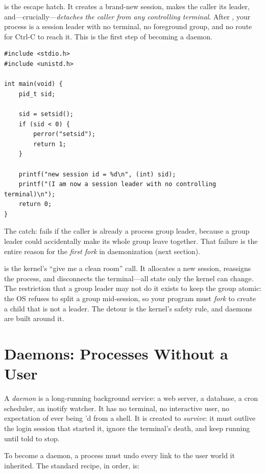  is the escape hatch. It creates a brand-new session,
makes the caller its leader, and---crucially---\emph{detaches the
caller from any controlling terminal}. After , your
process is a session leader with no terminal, no foreground group, and
no route for Ctrl-C to reach it. This is the first step of becoming a
daemon.

\begin{lstlisting}[caption={setsid: new session, no terminal.}]
#include <stdio.h>
#include <unistd.h>

int main(void) {
    pid_t sid;

    sid = setsid();
    if (sid < 0) {
        perror("setsid");
        return 1;
    }

    printf("new session id = %d\n", (int) sid);
    printf("(I am now a session leader with no controlling terminal)\n");
    return 0;
}
\end{lstlisting}

The catch:  fails if the caller is already a process
group leader, because a group leader could accidentally make its whole
group leave together. That failure is the entire reason for the
\emph{first fork} in daemonization (next section).

\begin{osconcept}
 is the kernel's ``give me a clean room'' call. It
allocates a new session, reassigns the process, and disconnects the
terminal---all state only the kernel can change. The restriction that
a group leader may not do it exists to keep the group atomic: the OS
refuses to split a group mid-session, so your program must
\emph{fork} to create a child that is not a leader. The detour is the
kernel's safety rule, and daemons are built around it.
\end{osconcept}

\section{Daemons: Processes Without a User}

A \emph{daemon} is a long-running background service: a web server, a
database, a cron scheduler, an inotify watcher. It has no terminal, no
interactive user, no expectation of ever being 'd from a
shell. It is created to \emph{survive}: it must outlive the login
session that started it, ignore the terminal's death, and keep running
until told to stop.

To become a daemon, a process must undo every link to the user world
it inherited. The standard recipe, in order, is:

